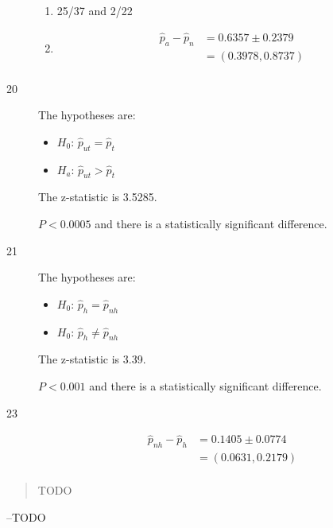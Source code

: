 \documentclass[letterpaper, landscape]{exam}
\begin{document}
\begin{description}
\begin{enumerate}[label = ({\alph*})]
          \item 25/37 and 2/22

          \item 
            \begin{align*}
              \hat{p}_{a} - \hat{p}_{n} & = 0.6357 \pm 0.2379 \\
                                        & = (0.3978, 0.8737) \\
            \end{align*}
        \end{enumerate}

      \item[20]
        The hypotheses are:
        \begin{itemize}[label = {}, itemsep = 0pt]
          \item $H_0$: $\hat{p}_{ut} = \hat{p}_{t}$
          \item $H_a$: $\hat{p}_{ut} > \hat{p}_{t}$
        \end{itemize}

        The z-statistic is 3.5285. 
        
        $P < 0.0005$ and there is a statistically significant difference. 

      \item[21]
        The hypotheses are:
        \begin{itemize}[label = {}, itemsep = 0pt]
          \item $H_0$: $\hat{p}_{h} = \hat{p}_{nh}$
          \item $H_0$: $\hat{p}_{h} \ne \hat{p}_{nh}$
        \end{itemize}

        The z-statistic is 3.39.
        
        $P < 0.001$ and there is a statistically significant difference. 

      \item[23]
        \begin{align*}
          \hat{p}_{nh} - \hat{p}_{h} & = 0.1405 \pm 0.0774 \\
                                     & = (0.0631, 0.2179) \\
        \end{align*}

  \end{description}

  \else
    \vspace{12 cm}
    \begin{quote}
      \begin{em}
        TODO
      \end{em}
    \end{quote}
    \hspace{1 cm}--TODO
  \fi
\end{document}
